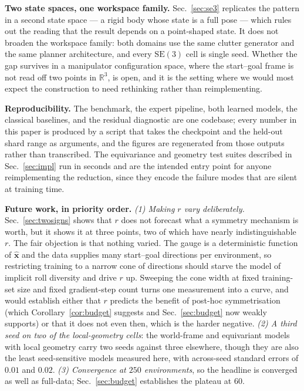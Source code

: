 \documentclass[10pt,twocolumn,letterpaper]{article}
\theoremstyle{plain}
\newcommand{\xhat}{\hat{\mathbf{x}}}
\newcommand{\SE}{\mathrm{SE}(3)}
\begin{document}
\textbf{Two state spaces, one workspace family.} Sec.~\ref{sec:se3} replicates
the pattern in a second state space --- a rigid body whose state is a full pose
--- which rules out the reading that the result depends on a point-shaped state.
It does not broaden the workspace family: both domains use the same clutter
generator and the same planner architecture, and every $\SE$ cell is single seed.
Whether the gap survives in a manipulator configuration space, where the
start--goal frame is not read off two points in $\mathbb{R}^3$, is open, and it is
the setting where we would most expect the construction to need rethinking rather
than reimplementing.

\textbf{Reproducibility.} The benchmark, the expert pipeline, both learned models,
the classical baselines, and the residual diagnostic are one codebase; every
number in this paper is produced by a script that takes the checkpoint and the
held-out shard range as arguments, and the figures are regenerated from those
outputs rather than transcribed. The equivariance and geometry test suites
described in Sec.~\ref{sec:impl} run in seconds and are the intended entry point
for anyone reimplementing the reduction, since they encode the failure modes that
are silent at training time.

\textbf{Future work, in priority order.} \emph{(1) Making $r$ vary
deliberately.} Sec.~\ref{sec:twosigns} shows that $r$ does not forecast what a
symmetry mechanism is worth, but it shows it at three points, two of which have
nearly indistinguishable $r$. The fair objection is that nothing varied. The
gauge is a deterministic function of $\xhat$ and the data supplies many
start--goal directions per environment, so restricting training to a narrow cone
of directions should starve the model of implicit roll diversity and drive $r$
up. Sweeping the cone width at fixed training-set size and fixed gradient-step
count turns one measurement into a curve, and would establish either that $r$
predicts the benefit of post-hoc symmetrisation (which
Corollary~\ref{cor:budget} suggests and Sec.~\ref{sec:budget} now weakly
supports) or that it does not even then, which is the harder negative.
\emph{(2) A third seed on two of the local-geometry cells}: the world-frame and
equivariant models with local geometry carry two seeds against three elsewhere,
though they are also the least seed-sensitive models measured here, with
across-seed standard errors of $0.01$ and $0.02$.
\emph{(3) Convergence at $250$ environments}, so the
headline is converged as well as full-data; Sec.~\ref{sec:budget} establishes the
plateau at $60$.
\end{document}
